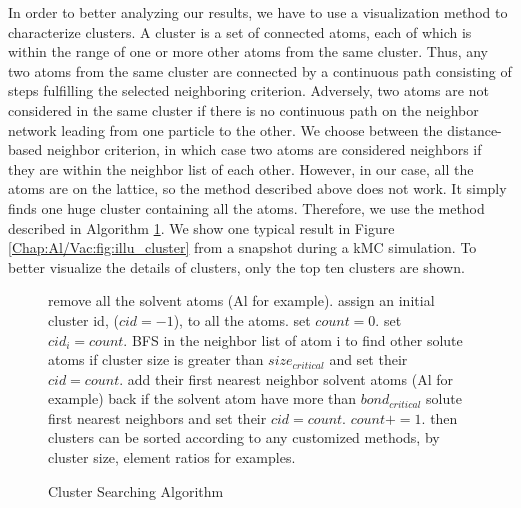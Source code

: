 In order to better analyzing our results, we have to use a visualization method to characterize clusters. A cluster is a set of connected atoms, each of which is within the range of one or more other atoms from the same cluster. Thus, any two atoms from the same cluster are connected by a continuous path consisting of steps fulfilling the selected neighboring criterion. Adversely, two atoms are not considered in the same cluster if there is no continuous path on the neighbor network leading from one particle to the other. We choose between the distance-based neighbor criterion, in which case two atoms are considered neighbors if they are within the neighbor list of each other. However, in our case, all the atoms are on the lattice, so the method described above does not work. It simply finds one huge cluster containing all the atoms. Therefore, we use the method described in Algorithm \ref{algo:cluster}. We show one typical result in Figure \ref{Chap:Al/Vac:fig:illu_cluster} from a snapshot during a \ac{kMC} simulation. To better visualize the details of clusters,  only the top ten clusters are shown. 


\begin{figure}[!htb]
  \centering
  \begin{minipage}{.75\linewidth}
    \begin{algorithm}[H]
      \caption{Cluster Searching Algorithm}\label{algo:cluster}
      \begin{algorithmic}[1]
        \State remove all the solvent atoms (Al for example).
        \State assign an initial cluster id, ($cid = -1$), to all the atoms.
        \State set $count = 0$.
            \State set $cid_i = count$.
            \State \ac{BFS} in the neighbor list of atom i to find other solute atoms if cluster size is greater than $size_{critical}$ and set their $cid = count$.
            \State add their first nearest neighbor solvent atoms (Al for example) back if the solvent atom have more than $bond_{critical}$ solute first nearest neighbors and set their $cid = count$.
            \State $count += 1$.
          \EndIf
        \EndFor
        \State then clusters can be sorted according to any customized methods, by cluster size, element ratios for examples.
      \end{algorithmic}
    \end{algorithm}
  \end{minipage}
\end{figure}


